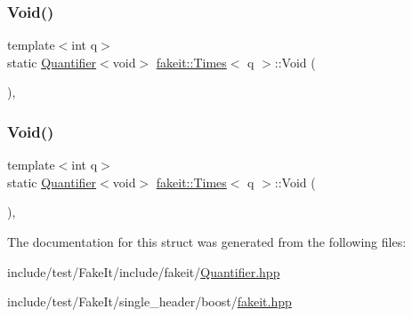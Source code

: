 \mbox{\label{structfakeit_1_1Times_ab473a1b456a5d360aff2fc5c4749ecae}} 
\subsubsection{\texorpdfstring{Void()}{Void()}\hspace{0.1cm}{\footnotesize\ttfamily [8/9]}}
{\footnotesize\ttfamily template$<$int q$>$ \\
static \mbox{\hyperlink{structfakeit_1_1Quantifier}{Quantifier}}$<$void$>$ \mbox{\hyperlink{structfakeit_1_1Times}{fakeit\+::\+Times}}$<$ q $>$\+::Void (\begin{DoxyParamCaption}{ }\end{DoxyParamCaption})\hspace{0.3cm}{\ttfamily [inline]}, {\ttfamily [static]}}

\mbox{\label{structfakeit_1_1Times_ab473a1b456a5d360aff2fc5c4749ecae}} 
\subsubsection{\texorpdfstring{Void()}{Void()}\hspace{0.1cm}{\footnotesize\ttfamily [9/9]}}
{\footnotesize\ttfamily template$<$int q$>$ \\
static \mbox{\hyperlink{structfakeit_1_1Quantifier}{Quantifier}}$<$void$>$ \mbox{\hyperlink{structfakeit_1_1Times}{fakeit\+::\+Times}}$<$ q $>$\+::Void (\begin{DoxyParamCaption}{ }\end{DoxyParamCaption})\hspace{0.3cm}{\ttfamily [inline]}, {\ttfamily [static]}}



The documentation for this struct was generated from the following files\+:\begin{DoxyCompactItemize}
\item 
include/test/\+Fake\+It/include/fakeit/\mbox{\hyperlink{Quantifier_8hpp}{Quantifier.\+hpp}}\item 
include/test/\+Fake\+It/single\+\_\+header/boost/\mbox{\hyperlink{single__header_2boost_2fakeit_8hpp}{fakeit.\+hpp}}\end{DoxyCompactItemize}
